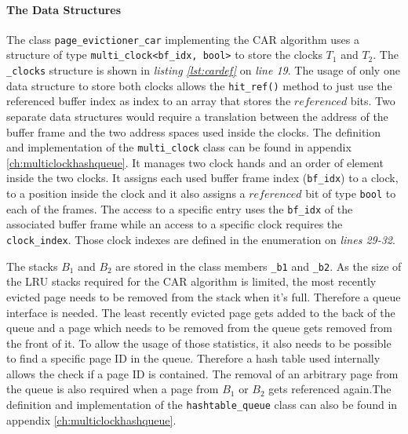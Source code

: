 \paragraph{The Data Structures}

\begin{@empty}
    \lstset{
        language = [ISO]C++,
        style = basic
    }
    \begin{code}[ht!]
        \caption{Data Structures of the Class \lstinline{page_evictioner_car}} \label{lst:cardef}
        
    \end{code}
\end{@empty}

    The class \lstinline{page_evictioner_car} implementing the CAR algorithm uses a structure of type \lstinline{multi_clock<bf_idx, bool>} to store the clocks $T_1$ and $T_2$. The \lstinline{_clocks} structure is shown in \emph{listing \ref{lst:cardef}} on \emph{line 19}. The usage of only one data structure to store both clocks allows the \lstinline{hit_ref()} method to just use the referenced buffer index as index to an array that stores the $referenced$ bits. Two separate data structures would require a translation between the address of the buffer frame and the two address spaces used inside the clocks. The definition and implementation of the \lstinline{multi_clock} class can be found in appendix \ref{ch:multiclockhashqueue}. It manages two clock hands and an order of element inside the two clocks. It assigns each used buffer frame index (\lstinline{bf_idx}) to a clock, to a position inside the clock and it also assigns a $referenced$ bit of type \lstinline{bool} to each of the frames. The access to a specific entry uses the \lstinline{bf_idx} of the associated buffer frame while an access to a specific clock requires the \lstinline{clock_index}. Those clock indexes are defined in the enumeration on \emph{lines 29-32}.

    The stacks $B_1$ and $B_2$ are stored in the class members \lstinline{_b1} and \lstinline{_b2}. As the size of the LRU stacks required for the CAR algorithm is limited, the most recently evicted page needs to be removed from the stack when it's full. Therefore a queue interface is needed. The least recently evicted page gets added to the back of the queue and a page which needs to be removed from the queue gets removed from the front of it. To allow the usage of those statistics, it also needs to be possible to find a specific page ID in the queue. Therefore a hash table used internally allows the check if a page ID is contained. The removal of an arbitrary page from the queue is also required when a page from $B_1$ or $B_2$ gets referenced again.The definition and implementation of the \lstinline{hashtable_queue} class can also be found in appendix \ref{ch:multiclockhashqueue}.

